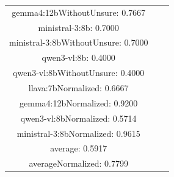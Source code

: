 \documentclass[a4paper]{article}
\begin{document}
\begin{tabular}{ccc}
gemma4:12bWithoutUnsure: 0.7667 \\ ministral-3:8b: 0.7000 \\ ministral-3:8bWithoutUnsure: 0.7000 \\ qwen3-vl:8b: 0.4000 \\ qwen3-vl:8bWithoutUnsure: 0.4000 \\ llava:7bNormalized: 0.6667 \\ gemma4:12bNormalized: 0.9200 \\ qwen3-vl:8bNormalized: 0.5714 \\ ministral-3:8bNormalized: 0.9615 \\ average: 0.5917 \\ averageNormalized: 0.7799 \end{minipage}\\
\end{tabular}

\vspace{5mm}
\end{document}
